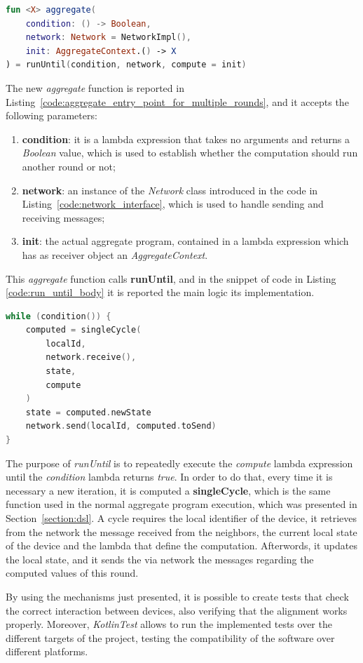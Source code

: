 \begin{lstlisting}[caption={Aggregate programming entry point used to compute multiple rounds}, captionpos=b, language=Kotlin, label={code:aggregate_entry_point_for_multiple_rounds}]
fun <X> aggregate(
    condition: () -> Boolean,
    network: Network = NetworkImpl(),
    init: AggregateContext.() -> X
) = runUntil(condition, network, compute = init)
\end{lstlisting}

The new \textit{aggregate} function is reported in Listing~\ref{code:aggregate_entry_point_for_multiple_rounds}, and it accepts the following parameters:
\begin{enumerate}
    \item \textbf{condition}: it is a lambda expression that takes no arguments and returns a \textit{Boolean} value, which is used to establish whether the computation should run another round or not;
    \item \textbf{network}: an instance of the \textit{Network} class introduced in the code in Listing~\ref{code:network_interface}, which is used to handle sending and receiving messages;
    \item \textbf{init}: the actual aggregate program, contained in a lambda expression which has as receiver object an \textit{AggregateContext}.
\end{enumerate}

This \textit{aggregate} function calls \textbf{runUntil},  and in the snippet of code in Listing \ref{code:run_until_body} it is reported the main logic its implementation.
\begin{lstlisting}[caption={Main logic of the \textit{runUntil} function}, captionpos=b, language=Kotlin, label={code:run_until_body}]
while (condition()) {
    computed = singleCycle(
        localId,
        network.receive(),
        state,
        compute
    )
    state = computed.newState
    network.send(localId, computed.toSend)
}
\end{lstlisting}

The purpose of \textit{runUntil} is to repeatedly execute the \textit{compute} lambda expression until the \textit{condition} lambda returns \textit{true}.\newline
In order to do that, every time it is necessary a new iteration, it is computed a \textbf{singleCycle}, which is the same function used in the normal aggregate program execution, which was presented in Section~\ref{section:dsl}. A cycle requires the local identifier of the device, it retrieves from the network the message received from the neighbors, the current local state of the device and the lambda that define the computation.\newline
Afterwords, it updates the local state, and it sends the via network the messages regarding the computed values of this round.

By using the mechanisms just presented, it is possible to create tests that check the correct interaction between devices, also verifying that the alignment works properly. Moreover, \textit{KotlinTest} allows to run the implemented tests over the different targets of the project, testing the compatibility of the software over different platforms.
